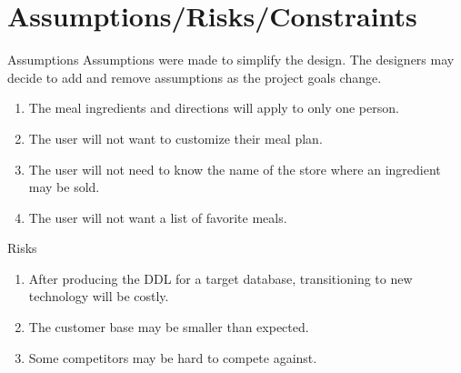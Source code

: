 \documentclass[a4paper,10pt,toc=graduated]{article}
\begin{document}
\section{Assumptions/Risks/Constraints}
\begin{mySubsection}{Assumptions}
Assumptions were made to simplify the design.
The designers may decide to add and remove assumptions
as the project goals change.
\begin{enumerate}
\item The meal ingredients and directions will apply to only one person.
\item The user will not want to customize their meal plan.
\item The user will not need to know the name of the store where an ingredient may be sold.
\item The user will not want a list of favorite meals.
\end{enumerate}
\end{mySubsection}
\begin{mySubsection}{Risks}
\begin{enumerate}
\item After producing the DDL for a target database, transitioning to new technology will be costly.
\item The customer base may be smaller than expected.
\item Some competitors may be hard to compete against.
\end{enumerate}
\end{mySubsection}
\end{document}
